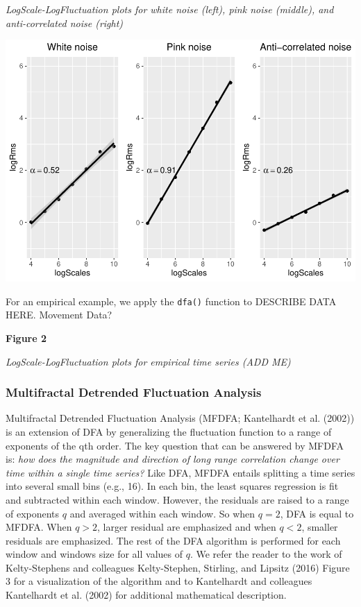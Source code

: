 \documentclass[
  english,
  man]{apa6}
\begin{document}
\emph{LogScale-LogFluctuation plots for white noise (left), pink noise
(middle), and anti-correlated noise (right)}

\includegraphics{fractal_regression_paper_brm_files/figure-latex/unnamed-chunk-3-1.pdf}

For an empirical example, we apply the \texttt{dfa()} function to DESCRIBE DATA
HERE. Movement Data?

\textbf{Figure 2}

\emph{LogScale-LogFluctuation plots for empirical time series (ADD ME)}

\hypertarget{multifractal-detrended-fluctuation-analysis}{%
\subsubsection{Multifractal Detrended Fluctuation Analysis}\label{multifractal-detrended-fluctuation-analysis}}

Multifractal Detrended Fluctuation Analysis (MFDFA;
Kantelhardt et al. (2002)) is an extension of DFA
by generalizing the fluctuation function to a range of exponents of the
qth order. The key question that can be answered by MFDFA is: \emph{how does
the magnitude and direction of long range correlation change over time
within a single time series?} Like DFA, MFDFA entails splitting a time
series into several small bins (e.g., 16). In each bin, the least
squares regression is fit and subtracted within each window. However,
the residuals are raised to a range of exponents \(q\) and averaged within
each window. So when \(q = 2\), DFA is equal to MFDFA. When \(q >2\), larger
residual are emphasized and when \(q < 2\), smaller residuals are
emphasized. The rest of the DFA algorithm is performed for each window
and windows size for all values of \(q\). We refer the reader to the work
of Kelty-Stephens and colleagues
Kelty-Stephen, Stirling, and Lipsitz (2016) Figure 3 for a
visualization of the algorithm and to Kantelhardt and colleagues
Kantelhardt et al. (2002) for additional
mathematical description.
\end{document}
